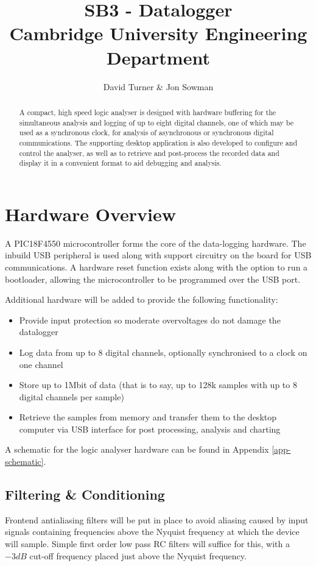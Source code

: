 \documentclass[11pt]{article}
\title{SB3 - Datalogger\\Cambridge University Engineering Department}
\author{David Turner \& Jon Sowman}
\begin{document}
    \maketitle
	
\begin{abstract}
    A compact, high speed logic analyser is designed with hardware buffering for the simultaneous analysis and logging of up to eight digital channels, one of which may be used as a synchronous clock, for analysis of asynchronous or synchronous digital communications. The supporting desktop application is also developed to configure and control the analyser, as well as to retrieve and post-process the recorded data and display it in a convenient format to aid debugging and analysis.
\end{abstract}

\section{Hardware Overview}
    A PIC18F4550 microcontroller forms the core of the data-logging hardware. The inbuild USB peripheral is used along with support circuitry on the board for USB communications. A hardware reset function exists along with the option to run a bootloader, allowing the microcontroller to be programmed over the USB port.

    Additional hardware will be added to provide the following functionality:
    \begin{itemize}
    \item Provide input protection so moderate overvoltages do not damage the datalogger
    \item Log data from up to 8 digital channels, optionally synchronised to a clock on one channel
    \item Store up to 1Mbit of data (that is to say, up to 128k samples with up to 8 digital channels per sample)
    \item Retrieve the samples from memory and transfer them to the desktop computer via USB interface for post processing, analysis and charting
    \end{itemize}

    A schematic for the logic analyser hardware can be found in Appendix
    \ref{app-schematic}.

    \subsection{Filtering \& Conditioning}
    Frontend antialiasing filters will be put in place to avoid aliasing caused by input signals containing frequencies above the Nyquist frequency at which the device will sample. Simple first order low pass RC filters will suffice for this, with a $-3dB$ cut-off frequency placed just above the Nyquist frequency.
\end{document}
